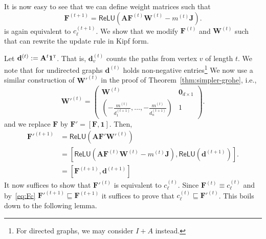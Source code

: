 It is now easy to see that we can define weight matrices such that
\[
    \mathbf{F}^{(t+1)} = \textsf{ReLU}\left(\mathbf{AF}^{(t)}\mathbf{W}^{(t)}-m^{(t)}\mathbf{J}\right).
\]
is again equivalent to $c_\ell^{(t+1)}$.  We show that we modify $\mathbf{F}^{(t)}$ and $\mathbf{W}^{(t)}$
such that can rewrite the update rule in Kipf form.

Let $\mathbf{d}^{(t)}:=\mathbf{A}^{t}\mathbf{1}^\textsc{t}$. That is, $\mathbf{d}^{(t)}_v$ counts the paths from vertex $v$ of length $t$. We note that for undirected graphs $\mathbf{d}^{(t)}$ holds non-negative entries\footnote{For directed graphs, we may consider $I+A$ instead.}
We now use a similar construction of $\mathbf{W'}^{(t)}$ in the proof of Theorem~\ref{thm:simpler-grohe}, i.e.,
\[
\mathbf{W'}^{(t)}=\begin{pmatrix}
\mathbf{W}^{(t)} & \mathbf{0}_{d\times 1}\\
\left(-\frac{m^{(t)}}{d_1^{(t+1)}},\ldots,-\frac{m^{(t)}}{d_n^{(t+1)}}\right) & 1
\end{pmatrix}.
\]
and we replace $\mathbf{F}$ by $\mathbf{F'}=[\mathbf{F},\mathbf{1}]$. Then,
\begin{align}
    \mathbf{F'}^{(t+1)} 
        &=\textsf{ReLU}(\mathbf{A}\mathbf{F'}\mathbf{W'}^{(t)}) \nonumber \\
        &=[\textsf{ReLU}(\mathbf{A}\mathbf{F}^{(t)}\mathbf{W}^{(t)}-m^{(t)}\mathbf{J}),\textsf{ReLU}(\mathbf{d}^{(t+1)})]. \nonumber \\
        &=[\mathbf{F}^{(t+1)}, \mathbf{d}^{(t+1)}] \label{eq:Fc}
\end{align}
It now suffices to show that $\mathbf{F'}^{(t)}$ is equivalent to $c_\ell^{(t)}$. Since $\mathbf{F}^{(t)} \equiv c_\ell^{(t)}$ and by~\eqref{eq:Fc} $\mathbf{F'}^{(t+1)} \sqsubseteq \mathbf{F}^{(t+1)}$ it suffices to prove that $c_\ell^{(t)} \sqsubseteq \mathbf{F'}^{(t)}$.
This boils down to the following lemma.

